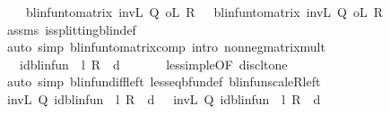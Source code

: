 \begin{isabellebody}
\ {\isacharasterisk}{\kern0pt}{\isacharcolon}{\kern0pt}\ {\isachardoublequoteopen}{}\ {\isasymle}\ blinfun{\isacharunderscore}{\kern0pt}to{\isacharunderscore}{\kern0pt}matrix\ {\isacharparenleft}{\kern0pt}{\isacharparenleft}{\kern0pt}inv\isactrlsub L\ Q{}{\isacharparenright}{\kern0pt}\ o\isactrlsub L\ R{}{\isacharparenright}{\kern0pt}{\isachardoublequoteclose}\ {\isachardoublequoteopen}{}\ {\isasymle}\ blinfun{\isacharunderscore}{\kern0pt}to{\isacharunderscore}{\kern0pt}matrix\ {\isacharparenleft}{\kern0pt}{\isacharparenleft}{\kern0pt}inv\isactrlsub L\ Q{}{\isacharparenright}{\kern0pt}\ o\isactrlsub L\ R{}{\isacharparenright}{\kern0pt}{\isachardoublequoteclose}\isanewline
\ \ \ \ \isamarkupfalse%
\ assms\ is{\isacharunderscore}{\kern0pt}splitting{\isacharunderscore}{\kern0pt}blin{\isacharunderscore}{\kern0pt}def{\isacharprime}{\kern0pt}\ \isanewline
\ \ \ \ \isamarkupfalse%
\ {\isacharparenleft}{\kern0pt}auto\ simp{\isacharcolon}{\kern0pt}\ blinfun{\isacharunderscore}{\kern0pt}to{\isacharunderscore}{\kern0pt}matrix{\isacharunderscore}{\kern0pt}comp\ intro{\isacharcolon}{\kern0pt}\ nonneg{\isacharunderscore}{\kern0pt}matrix{\isacharunderscore}{\kern0pt}mult{\isacharparenright}{\kern0pt}\isanewline
\isanewline
\ \ \isamarkupfalse%
\ {\isachardoublequoteopen}{}\ {\isasymle}\ {\isacharparenleft}{\kern0pt}id{\isacharunderscore}{\kern0pt}blinfun\ {\isacharminus}{\kern0pt}\ l\ {\isacharasterisk}{\kern0pt}\isactrlsub R\ {\isasymP}\ d{\isacharparenright}{\kern0pt}\ {}{\isachardoublequoteclose}\isanewline
\ \ \ \ \isamarkupfalse%
\ less{\isacharunderscore}{\kern0pt}imp{\isacharunderscore}{\kern0pt}le{\isacharbrackleft}{\kern0pt}OF\ disc{\isacharunderscore}{\kern0pt}lt{\isacharunderscore}{\kern0pt}one{\isacharbrackright}{\kern0pt}\isanewline
\ \ \ \ \isamarkupfalse%
\ {\isacharparenleft}{\kern0pt}auto\ simp{\isacharcolon}{\kern0pt}\ blinfun{\isachardot}{\kern0pt}diff{\isacharunderscore}{\kern0pt}left\ less{\isacharunderscore}{\kern0pt}eq{\isacharunderscore}{\kern0pt}bfun{\isacharunderscore}{\kern0pt}def\ blinfun{\isachardot}{\kern0pt}scaleR{\isacharunderscore}{\kern0pt}left{\isacharparenright}{\kern0pt}\isanewline
\ \ \isamarkupfalse%
\ {\isachardoublequoteopen}{\isacharparenleft}{\kern0pt}inv\isactrlsub L\ Q{}{\isacharparenright}{\kern0pt}\ {\isacharparenleft}{\kern0pt}{\isacharparenleft}{\kern0pt}id{\isacharunderscore}{\kern0pt}blinfun\ {\isacharminus}{\kern0pt}\ l\ {\isacharasterisk}{\kern0pt}\isactrlsub R\ {\isasymP}\ d{\isacharparenright}{\kern0pt}\ {}{\isacharparenright}{\kern0pt}\ {\isasymle}\ {\isacharparenleft}{\kern0pt}inv\isactrlsub L\ Q{}{\isacharparenright}{\kern0pt}\ {\isacharparenleft}{\kern0pt}{\isacharparenleft}{\kern0pt}id{\isacharunderscore}{\kern0pt}blinfun\ {\isacharminus}{\kern0pt}\ l\ {\isacharasterisk}{\kern0pt}\isactrlsub R\ {\isasymP}\ d{\isacharparenright}{\kern0pt}\ {}{\isacharparenright}{\kern0pt}{\isachardoublequoteclose}\isanewline

\end{isabellebody}
